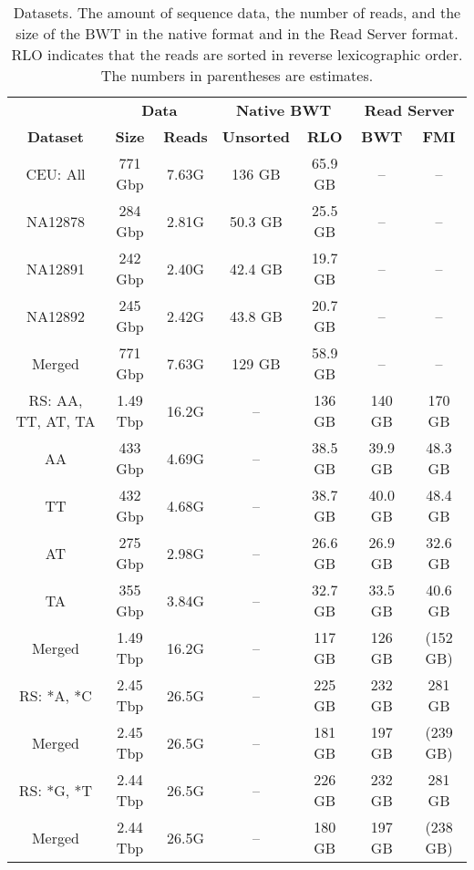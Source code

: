 \documentclass[smallabstract,smallcaptions]{dccpaper}
\newcommand{\BWT}{\textsf{BWT}}
\newcommand{\FMI}{\textsf{FMI}}
\newcommand{\CEU}{\textsf{CEU}}
\newcommand{\RS}{\textsf{RS}}
\begin{document}
\begin{table}[t!]
\begin{center}
\caption{Datasets. The amount of sequence data, the number of reads, and the size of the \BWT{} in the native format and in the Read Server format. RLO indicates that the reads are sorted in reverse lexicographic order. The numbers in parentheses are estimates.}\label{table:datasets}\smallskip%
{
\renewcommand{\baselinestretch}{1}\footnotesize
\begin{tabular}{c|cc|cc|cc}
\hline
 & \multicolumn{2}{c|}{\textbf{Data}} & \multicolumn{2}{c|}{\textbf{Native \BWT}} &
 \multicolumn{2}{c}{\textbf{Read Server}} \\
\textbf{Dataset} & \textbf{Size} & \textbf{Reads} & \textbf{Unsorted} & \textbf{RLO} & \textbf{\BWT} & \textbf{\FMI} \\
\hline
\CEU: All           &  771 Gbp & 7.63G &  136 GB & 65.9 GB &      -- &       -- \\
NA12878             &  284 Gbp & 2.81G & 50.3 GB & 25.5 GB &      -- &       -- \\
NA12891             &  242 Gbp & 2.40G & 42.4 GB & 19.7 GB &      -- &       -- \\
NA12892             &  245 Gbp & 2.42G & 43.8 GB & 20.7 GB &      -- &       -- \\
Merged              &  771 Gbp & 7.63G &  129 GB & 58.9 GB &      -- &       -- \\
\hline
\RS: AA, TT, AT, TA & 1.49 Tbp & 16.2G &      -- &  136 GB &  140 GB &   170 GB \\
AA                  &  433 Gbp & 4.69G &      -- & 38.5 GB & 39.9 GB &  48.3 GB \\
TT                  &  432 Gbp & 4.68G &      -- & 38.7 GB & 40.0 GB &  48.4 GB \\
AT                  &  275 Gbp & 2.98G &      -- & 26.6 GB & 26.9 GB &  32.6 GB \\
TA                  &  355 Gbp & 3.84G &      -- & 32.7 GB & 33.5 GB &  40.6 GB \\
Merged              & 1.49 Tbp & 16.2G &      -- &  117 GB &  126 GB & (152 GB) \\
\hline
\RS: *A, *C         & 2.45 Tbp & 26.5G &      -- &  225 GB &  232 GB &   281 GB \\
Merged              & 2.45 Tbp & 26.5G &      -- &  181 GB &  197 GB & (239 GB) \\
\hline
\RS: *G, *T         & 2.44 Tbp & 26.5G &      -- &  226 GB &  232 GB &   281 GB \\
Merged              & 2.44 Tbp & 26.5G &      -- &  180 GB &  197 GB & (238 GB) \\
\hline
\end{tabular}}
\end{center}%
\vspace{-16pt}
\end{table}
\end{document}
